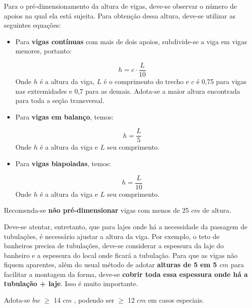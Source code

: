 Para o pré-dimensionamento da altura de vigas, deve-se observar o número de apoios na qual ela está sujeita. Para obtenção dessa altura, deve-se utilizar as seguintes equações:

\begin{itemize}
	\item Para \textbf{vigas contínuas} com mais de dois apoios, subdivide-se a viga em vigas menores, portanto:

		$$h=c  \cdot \frac{L}{10}$$
		Onde $h$  é a altura da viga, $L$ é o comprimento do trecho e $c$ é 0,75 para vigas nas extremidades e 0,7 para as demais. Adota-se a maior altura encontrada para toda a seção transversal.

	\item Para \textbf{vigas em balanço}, temos:

		$$h=\frac{L}{5}$$
		Onde $h$ é a altura da viga e $L$ seu comprimento.

	\item Para \textbf{vigas biapoiadas}, temos:
		
		$$h=\frac{L}{10}$$
		Onde $h$ é a altura da viga e $L$ seu comprimento.
\end{itemize}

Recomenda-se \textbf{não pré-dimensionar} vigas com menos de 25 $cm$ de altura.

Deve-se atentar, entretanto, que para lajes onde há a necessidade da passagem de tubulações, é necessário ajustar a altura da viga. Por exemplo, o teto de banheiros precisa de tubulações, deve-se considerar a espessura da laje do banheiro e a espessura do local onde ficará a tubulação. Para que as vigas não fiquem aparentes, além do usual método de adotar \textbf{alturas de 5 em 5 $cm$}  para facilitar a montagem da forma, deve-se \textbf{cobrir toda essa espessura onde há a tubulação + laje}. Isso é muito importante.

Adota-se $bw$ $\geqslant$ 14 $cm$ , podendo ser $\geqslant$ 12 $cm$ em casos especiais.